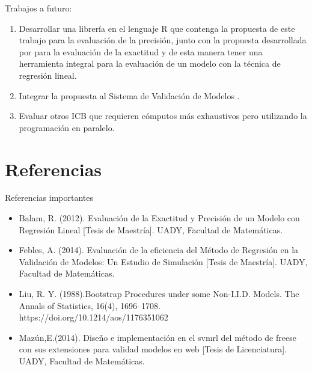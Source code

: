 \documentclass[serif, aspectratio=169]{beamer}
\begin{document}
\begin{frame}
	
	\begin{exampleblock}{Trabajos a futuro:}
		\begin{enumerate}
			\item Desarrollar una librería en el lenguaje R que contenga la propuesta de este trabajo para la evaluación de la precisión, junto con la propuesta desarrollada por \textcite{zacarias-2023} para la evaluación de la exactitud y de esta manera tener una herramienta integral para la evaluación de un modelo con la técnica de regresión lineal.
			
			\item Integrar la propuesta al Sistema de Validación de Modelos \parencite{mazun-2014}.
			
			
			\item Evaluar otros ICB que requieren cómputos más exhaustivos pero utilizando la programación en paralelo.
			
		\end{enumerate}
	\end{exampleblock}
	
\end{frame}







\section{Referencias}

\begin{frame}{Referencias importantes}
\begin{itemize}
	\item Balam, R. (2012). Evaluación de la Exactitud y Precisión de un Modelo con Regresión Lineal [Tesis de Maestría]. UADY, Facultad de Matemáticas.
	
	\item Febles, A. (2014). Evaluación de la eficiencia del Método de Regresión en la Validación de	Modelos: Un Estudio de Simulación [Tesis de Maestría]. UADY, Facultad de	Matemáticas.
	
	\item Liu, R. Y. (1988).Bootstrap Procedures under some Non-I.I.D. Models. The Annals of Statistics, 16(4), 1696–1708. https://doi.org/10.1214/aos/1176351062
	
	\item Mazún,E.(2014). Diseño e implementación en el svmrl del método de freese con sus
	extensiones para validad modelos en web [Tesis de Licenciatura]. UADY,
	Facultad de Matemáticas.

\end{itemize}
\end{frame}
\end{document}
